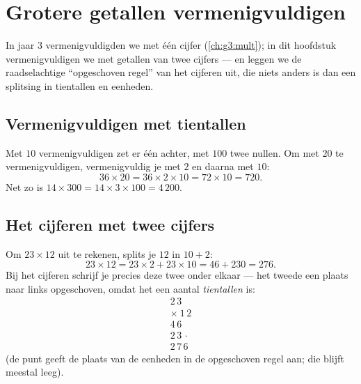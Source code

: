 \chapter{Grotere getallen vermenigvuldigen}\label{ch:g4:mult}

In jaar 3 vermenigvuldigden we met één cijfer (\cref{ch:g3:mult}); in dit
hoofdstuk vermenigvuldigen we met getallen van twee cijfers --- en leggen
we de raadselachtige ``opgeschoven regel'' van het cijferen uit, die niets
anders is dan een splitsing in tientallen en eenheden.

\section{Vermenigvuldigen met tientallen}

\begin{proposition}\label{prop:g4:mult:tens}
Met $10$ vermenigvuldigen zet er één  achter, met $100$ twee nullen. Om
met $20$ te vermenigvuldigen, vermenigvuldig je met $2$ en daarna met
$10$:
\[
36 \times 20 = 36 \times 2 \times 10 = 72 \times 10 = 720 .
\]
Net zo is $14 \times 300 = 14 \times 3 \times 100 = 4\,200$.
\end{proposition}
\admitted

\section{Het cijferen met twee cijfers}

\begin{example}\label{ex:g4:mult:why}
Om $23 \times 12$ uit te rekenen, splits je $12$ in $10 + 2$:
\[
23 \times 12 = 23 \times 2 + 23 \times 10 = 46 + 230 = 276 .
\]
Bij het cijferen schrijf je precies deze twee  onder elkaar ---
het tweede een plaats naar links opgeschoven, omdat het een aantal
\emph{tientallen} is:
\[
\begin{array}{r}
2\,3 \\
\times\ 1\,2 \\
\hline
4\,6 \\
2\,3\,\cdot \\
\hline
2\,7\,6
\end{array}
\]
(de punt geeft de plaats van de eenheden in de opgeschoven regel aan; die
blijft meestal leeg).
\end{example}

